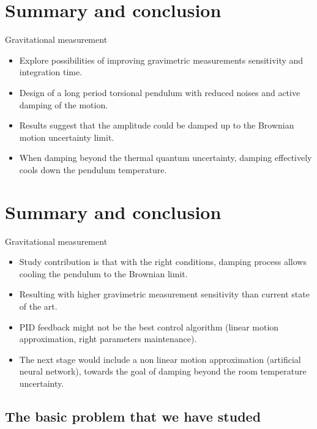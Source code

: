 \documentclass{beamer}
\begin{document}
\section{Summary and conclusion}
\begin{frame}{Gravitational measurement}
	\begin{itemize}
		\framesubtitle{Study achievements}
		
		\item Explore possibilities of improving gravimetric measurements sensitivity and integration time. 
		\item Design of a long period torsional pendulum with reduced noises and active damping of the motion. 
		\pause
		\item Results suggest that the amplitude could be damped up to the Brownian motion uncertainty limit. 
		\item When damping beyond the thermal quantum uncertainty, damping effectively cools down the pendulum temperature.
		
		
	\end{itemize}
\end{frame}

\section{Summary and conclusion}
\begin{frame}{Gravitational measurement}
	\begin{itemize}
		\framesubtitle{Study contribution}
		
		
		
		\item Study contribution is that with the right conditions, damping process allows cooling the pendulum to the Brownian limit. 
		\item Resulting with higher gravimetric measurement sensitivity than current state of the art.
		\pause
		\item PID feedback might not be the best control algorithm (linear motion approximation, right parameters maintenance). 
		\item The next stage would include a non linear motion approximation (artificial neural network), towards the goal of damping beyond the room temperature uncertainty. 
	\end{itemize}
\end{frame}






\subsection[Basic Problem]{The basic problem that we have studed}
\end{document}
